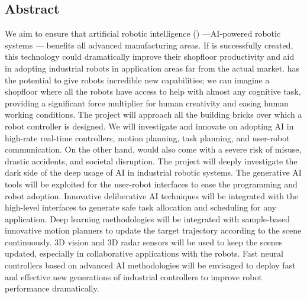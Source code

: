 \subsection*{\texorpdfstring{Abstract }{Abstract }}\label{abstract}

We aim to ensure that artificial robotic intelligence ()
---AI-powered robotic systems --- benefits all advanced manufacturing
areas. If  is successfully created, this technology could
dramatically improve their shopfloor productivity and aid in adopting
industrial robots in application areas far from the actual market.
 has the potential to give robots incredible new
capabilities; we can imagine a shopfloor where all the robots have
access to help with almost any cognitive task, providing a significant
force multiplier for human creativity and easing human working
conditions. The project will approach all the building bricks over which
a robot controller is designed. We will investigate and innovate on
adopting AI in high-rate real-time controllers, motion planning, task
planning, and user-robot communication. On the other hand, 
would also come with a severe risk of misuse, drastic accidents, and
societal disruption. The project will deeply investigate the dark side
of the deep usage of AI in industrial robotic systems. The generative AI
tools will be exploited for the user-robot interfaces to ease the
programming and robot adoption. Innovative deliberative AI techniques
will be integrated with the high-level interfaces to generate safe task
allocation and scheduling for any application. Deep learning
methodologies will be integrated with sample-based innovative motion
planners to update the target trajectory according to the scene
continuously. 3D vision and 3D radar sensors will be used to keep the
scenes updated, especially in collaborative applications with the
robots. Fast neural controllers based on advanced AI methodologies will
be envisaged to deploy fast and effective new generations of industrial
controllers to improve robot performance dramatically.
